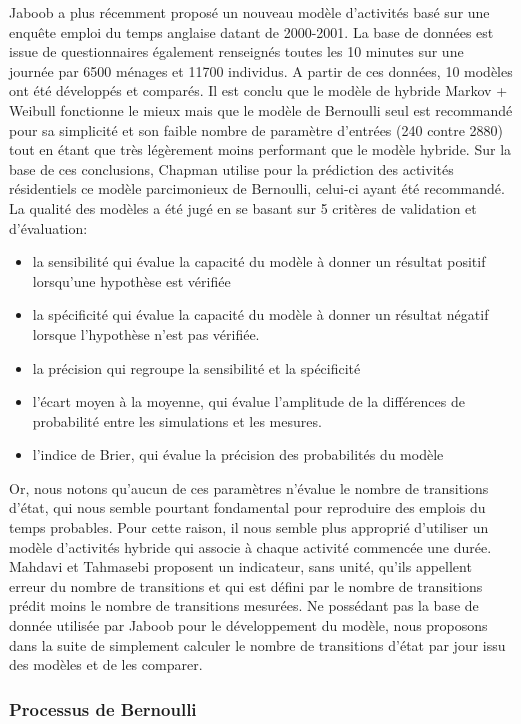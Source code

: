Jaboob \cite{Jaboob-16} a plus récemment proposé un nouveau modèle d'activités basé sur une enquête emploi du temps anglaise datant de 2000-2001. La base de données est issue de questionnaires également renseignés toutes les 10 minutes sur une journée par 6500 ménages et 11700 individus. A partir de ces données, 10 modèles ont été développés et comparés. Il est conclu que le modèle de hybride Markov + Weibull fonctionne le mieux mais que le modèle de Bernoulli seul est recommandé pour sa simplicité et son faible nombre de paramètre d'entrées (240 contre 2880) tout en étant que très légèrement moins performant que le modèle hybride. Sur la base de ces conclusions, Chapman \cite{Chapman-16} utilise pour la prédiction des activités résidentiels ce modèle parcimonieux de Bernoulli, celui-ci ayant été recommandé. La qualité des modèles a été jugé en se basant sur 5 critères de validation et d'évaluation: 
\begin{itemize}
\item la sensibilité qui évalue la capacité du modèle à donner un résultat positif lorsqu'une hypothèse est vérifiée
\item la spécificité qui évalue la capacité du modèle à donner un résultat négatif lorsque l'hypothèse n'est pas vérifiée.
\item la précision qui regroupe la sensibilité et la spécificité
\item l'écart moyen à la moyenne, qui évalue l'amplitude de la différences de probabilité entre les simulations et les mesures.
\item l'indice de Brier, qui évalue la précision des probabilités du modèle
\end{itemize}

Or, nous notons qu'aucun de ces paramètres n'évalue le nombre de transitions d'état, qui nous semble pourtant fondamental pour reproduire des emplois du temps probables. Pour cette raison, il nous semble plus approprié d'utiliser un modèle d'activités hybride qui associe à chaque activité commencée une durée. Mahdavi et Tahmasebi \cite{Mahdavi-2014} proposent un indicateur, sans unité, qu'ils appellent erreur du nombre de transitions et qui est défini par le nombre de transitions prédit moins le nombre de transitions mesurées. Ne possédant pas la base de donnée utilisée par Jaboob pour le développement du modèle, nous proposons dans la suite de simplement calculer le nombre de transitions d'état par jour issu des modèles et de les comparer.

\subsubsection{Processus de Bernoulli}

